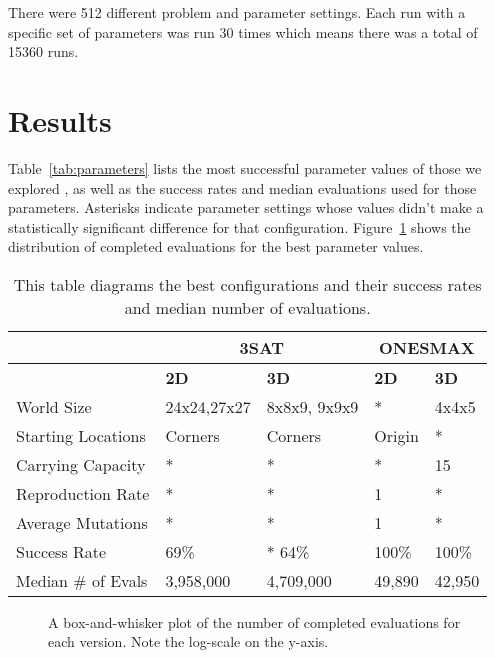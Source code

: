 \documentclass[12pt]{article}
\begin{document}
There were 512 different problem and parameter settings. Each run with a specific set of parameters was run 30 times which means there was a total of 15360 runs.

\section{Results} \label{sec:results}

Table~\ref{tab:parameters} lists the most successful parameter values of those we explored , as well as the success rates and median evaluations used for those parameters. Asterisks indicate parameter settings whose values didn't make a statistically significant difference for that configuration. Figure~\ref{fig:evalPlots} shows the distribution of completed evaluations for the best parameter values.

\begin{table}[tb]
\begin{center}
\begin{tabular}{|l||l|l||l|l|}
	\hline
	& \multicolumn{2}{|c||}{3SAT} & \multicolumn{2}{|c|}{ONESMAX} \\
	\hline
	& \textbf{2D} & \textbf{3D} & \textbf{2D} & \textbf{3D} \\ \hline
	World Size & 24x24,27x27 & 8x8x9, 9x9x9 & * & 4x4x5 \\
	Starting Locations & Corners & Corners & Origin & * \\
	Carrying Capacity & * & * &	* & 15 \\
	Reproduction Rate & * & * & 1 & * \\
	Average Mutations & * & * & 1 & * \\
	Success Rate &	69\% & * 64\% & 100\% & 100\% \\
	Median \# of Evals & 3,958,000 & 4,709,000 & 49,890 & 42,950 \\
	\hline
\end{tabular}
\caption{This table diagrams the best configurations and their success rates and median number of evaluations.}
\label{tab:results}
\end{center}
\end{table}

\begin{figure}[tb]

 \centering
 \caption{A box-and-whisker plot of the number of completed evaluations for each version. Note the log-scale on the y-axis.}
 \label{fig:evalPlots}

\end{figure}
\end{document}
